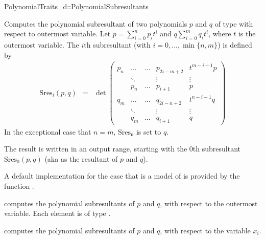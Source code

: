 \begin{ccRefConcept}{PolynomialTraits_d::PolynomialSubresultants}
\ccDefinition

Computes the polynomial subresultant of two polynomials $p$ and $q$ of 
type  with respect to outermost variable.
Let $p=\sum_{i=0}^n p_i t^i$ and $q\sum_{i=0}^m q_i t^i$, where $t$
is the outermost variable.
The $i$th subresultant (with $i=0,\ldots,\min\{n,m\}$) is defined by
\begin{eqnarray*}
\mathrm{Sres}_i(p,q)&=&\det \left(\begin{array}{cccccc}
p_n & \ldots &\ldots& p_{2i-m+2}&t^{m-i-1}p \\
&\ddots&&\vdots&\vdots\\
&p_n&\ldots&p_{i+1}&p\\
q_m & \ldots &\ldots & q_{2i-n+2}&t^{n-i-1}q \\
&\ddots&&\vdots&\vdots\\
&q_m&\ldots&q_{i+1}&q
\end{array}\right)
\end{eqnarray*}
In the exceptional case that $n=m$, $\mathrm{Sres_n}$ is set to $q$.

The result is written in an output range, starting with the $0$th subresultant
$\mathrm{Sres}_0(p,q)$
(aka as the resultant of $p$ and $q$).

A default implementation for the case that 
is a model of 
is provided by the function .

\ccOperations
{}
         { computes the polynomial subresultants of $p$ and $q$, 
           with respect to the outermost variable. Each element is of type
           .}

         { computes the polynomial subresultants of $p$ and $q$, 
           with respect to the variable $x_i$.}


\ccSeeAlso

\\
\\
\\

\end{ccRefConcept}
